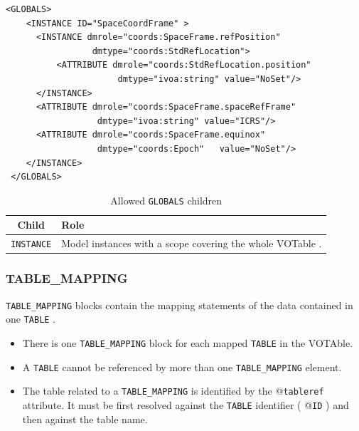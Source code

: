 \documentclass[11pt,a4paper]{ivoa}
\begin{document}
\begin{lstlisting}[caption={GLOBALS block example},style=XML]
  <GLOBALS>
    <INSTANCE ID="SpaceCoordFrame" >
      <INSTANCE dmrole="coords:SpaceFrame.refPosition" 
                 dmtype="coords:StdRefLocation">
          <ATTRIBUTE dmrole="coords:StdRefLocation.position" 
                      dmtype="ivoa:string" value="NoSet"/>
      </INSTANCE>
      <ATTRIBUTE dmrole="coords:SpaceFrame.spaceRefFrame" 
                  dmtype="ivoa:string" value="ICRS"/>
      <ATTRIBUTE dmrole="coords:SpaceFrame.equinox" 
                  dmtype="coords:Epoch"   value="NoSet"/>
    </INSTANCE>
 </GLOBALS>
\end{lstlisting}




\begin{table}[!htbp]
\small
\centering
\begin{tabulary}{\linewidth}{|c|J|}       
       \hline 
           \textbf{Child} &  
           \textbf{Role}\\
       \hline         \hline  
            \texttt{INSTANCE}    &  
            Model instances with a scope covering the whole VOTable . \\       
       \hline 
     \end{tabulary}
     \caption{Allowed  \texttt{GLOBALS} children} 
     \label{tbl:globals-children}
 \end{table}

\FloatBarrier
%
%

\subsubsection{TABLE\_MAPPING}

\texttt{TABLE\_MAPPING} blocks contain the mapping statements of the data contained in one \texttt{TABLE} .

\begin{itemize}
    \item There is one \texttt{TABLE\_MAPPING} block for each mapped \texttt{TABLE}  in the VOTAble.    
    \item A \texttt{TABLE} cannot be referenced by more than one \texttt{TABLE\_MAPPING} element.
    \item The table related to a \texttt{TABLE\_MAPPING} is identified by the @\texttt{tableref} attribute. 
            It must be first resolved against the \texttt{TABLE} identifier ( @\texttt{ID} ) and then against the table name.
\end{itemize}
\end{document}
